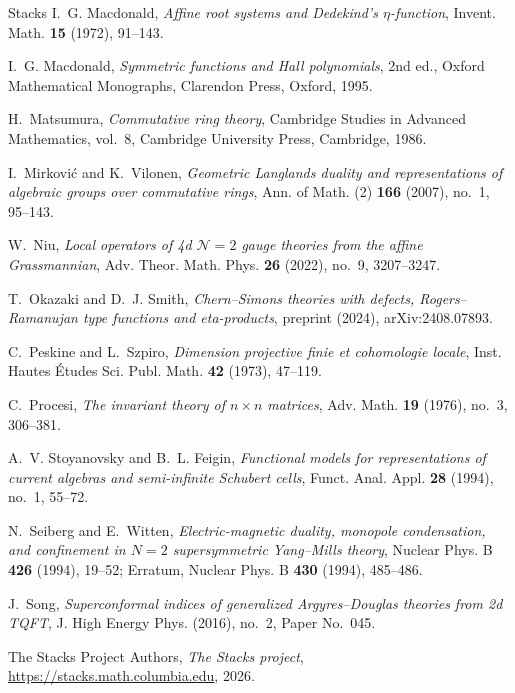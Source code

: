 \documentclass[11pt]{amsart}
\numberwithin{equation}{section}
\theoremstyle{definition}
\theoremstyle{remark}
\begin{document}
\begin{thebibliography}{Stacks}
I.~G. Macdonald, \emph{Affine root systems and Dedekind's $\eta$-function}, Invent. Math. \textbf{15} (1972), 91--143.

I.~G. Macdonald, \emph{Symmetric functions and Hall polynomials}, 2nd ed., Oxford Mathematical Monographs, Clarendon Press, Oxford, 1995.

H.~Matsumura, \emph{Commutative ring theory}, Cambridge Studies in Advanced Mathematics, vol.~8, Cambridge University Press, Cambridge, 1986.

I.~Mirkovi\'c and K.~Vilonen, \emph{Geometric Langlands duality and representations of algebraic groups over commutative rings}, Ann. of Math. (2) \textbf{166} (2007), no.~1, 95--143.

W.~Niu, \emph{Local operators of 4d $\mathcal N=2$ gauge theories from the affine Grassmannian}, Adv. Theor. Math. Phys. \textbf{26} (2022), no.~9, 3207--3247.

T.~Okazaki and D.~J. Smith, \emph{Chern--Simons theories with defects, Rogers--Ramanujan type functions and eta-products}, preprint (2024), arXiv:2408.07893.

C.~Peskine and L.~Szpiro, \emph{Dimension projective finie et cohomologie locale}, Inst. Hautes \'Etudes Sci. Publ. Math. \textbf{42} (1973), 47--119.

C.~Procesi, \emph{The invariant theory of $n\times n$ matrices}, Adv. Math. \textbf{19} (1976), no.~3, 306--381.

A.~V. Stoyanovsky and B.~L. Feigin, \emph{Functional models for representations of current algebras and semi-infinite Schubert cells}, Funct. Anal. Appl. \textbf{28} (1994), no.~1, 55--72.

N.~Seiberg and E.~Witten, \emph{Electric-magnetic duality, monopole condensation, and confinement in $N=2$ supersymmetric Yang--Mills theory}, Nuclear Phys. B \textbf{426} (1994), 19--52; Erratum, Nuclear Phys. B \textbf{430} (1994), 485--486.

J.~Song, \emph{Superconformal indices of generalized Argyres--Douglas theories from 2d TQFT}, J. High Energy Phys. (2016), no.~2, Paper No.~045.

The Stacks Project Authors, \emph{The Stacks project}, \url{https://stacks.math.columbia.edu}, 2026.


\end{thebibliography}
\end{document}
